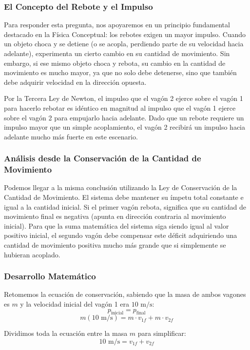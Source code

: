 \documentclass{article}
\begin{document}
\subsubsection*{El Concepto del Rebote y el Impulso}
Para responder esta pregunta, nos apoyaremos en un principio fundamental destacado en la Física Conceptual: los rebotes exigen un mayor impulso. Cuando un objeto choca y se detiene (o se acopla, perdiendo parte de su velocidad hacia adelante), experimenta un cierto cambio en su cantidad de movimiento. Sin embargo, si ese mismo objeto choca y rebota, su cambio en la cantidad de movimiento es mucho mayor, ya que no solo debe detenerse, sino que también debe adquirir velocidad en la dirección opuesta.

Por la Tercera Ley de Newton, el impulso que el vagón 2 ejerce sobre el vagón 1 para hacerlo rebotar es idéntico en magnitud al impulso que el vagón 1 ejerce sobre el vagón 2 para empujarlo hacia adelante. Dado que un rebote requiere un impulso mayor que un simple acoplamiento, el vagón 2 recibirá un impulso hacia adelante mucho más fuerte en este escenario.

\subsubsection*{Análisis desde la Conservación de la Cantidad de Movimiento}
Podemos llegar a la misma conclusión utilizando la Ley de Conservación de la Cantidad de Movimiento. El sistema debe mantener su ímpetu total constante e igual a la cantidad inicial. Si el primer vagón rebota, significa que su cantidad de movimiento final es negativa (apunta en dirección contraria al movimiento inicial). Para que la suma matemática del sistema siga siendo igual al valor positivo inicial, el segundo vagón debe compensar este déficit adquiriendo una cantidad de movimiento positiva mucho más grande que si simplemente se hubieran acoplado.

\subsubsection*{Desarrollo Matemático}
Retomemos la ecuación de conservación, sabiendo que la masa de ambos vagones es $m$ y la velocidad inicial del vagón 1 era $10 \text{ m/s}$:
$$p_{\text{inicial}} = p_{\text{final}}$$
$$m(10 \text{ m/s}) = m \cdot v_{1f} + m \cdot v_{2f}$$

Dividimos toda la ecuación entre la masa $m$ para simplificar:
$$10 \text{ m/s} = v_{1f} + v_{2f}$$
\end{document}
